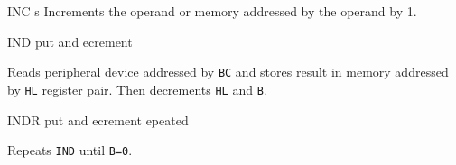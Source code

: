 \begin{basedescript}{
    \desclabelstyle{\multilinelabel}
    \desclabelwidth{3cm}}
\begin{DetailItem}{INC s}
        Increments the operand or memory addressed by the operand by 1.

        \begin{DetailEffects}[v]
            \FlagsINCr[8-bit]
        \end{DetailEffects}
				
        \begin{DetailTiming}
        \end{DetailTiming}

    \end{DetailItem}

    \pagebreak
    \begin{DetailItem}{IND}
        {put and ecrement}
        {\SymIND}

        Reads peripheral device addressed by {\tt BC} and stores result in memory addressed by {\tt HL} register pair. Then decrements {\tt HL} and {\tt B}.

        \begin{DetailEffects}
            \FlagsIND
        \end{DetailEffects}
				
        \begin{DetailTiming}
        \end{DetailTiming}

    \end{DetailItem}

    \begin{DetailItem}{INDR}
        {put and ecrement epeated}
        {\SymINDR}

        Repeats {\tt IND} until {\tt B=0}.

        \begin{DetailEffects}
            \FlagsINDR
            \end{DetailEffects}
				

\end{DetailItem}
\end{basedescript}
